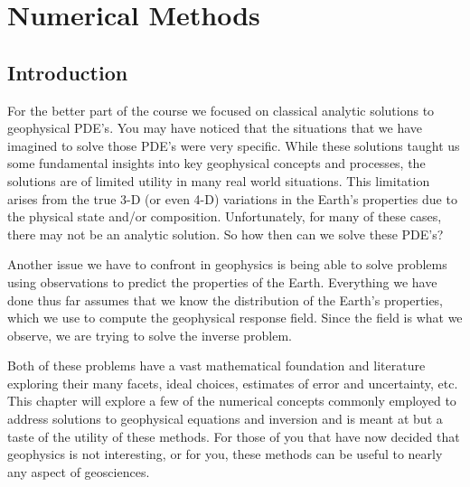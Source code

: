 \chapter{Numerical Methods}

\section{Introduction}
For the better part of the course we focused on classical analytic solutions to geophysical PDE's.  You may have noticed that the situations that we have imagined to solve those PDE's were very specific.  While these solutions taught us some fundamental insights into key geophysical concepts and processes, the solutions are of limited utility in many real world situations.  This limitation arises from the true 3-D (or even 4-D) variations in the Earth's properties due to the physical state and/or composition.  Unfortunately, for many of these cases, there may not be an analytic solution.  So how then can we solve these PDE's?

Another issue we have to confront in geophysics is being able to solve problems using observations to predict the properties of the Earth.  Everything we have done thus far assumes that we know the distribution of the Earth's properties, which we use to compute the geophysical response field.  Since the field is what we observe, we are trying to solve the inverse problem.

Both of these problems have a vast mathematical foundation and literature exploring their many facets, ideal choices, estimates of error and uncertainty, etc.  This chapter will explore a few of the numerical concepts commonly employed to address solutions to geophysical equations and inversion and is meant at but a taste of the utility of these methods.  For those of you that have now decided that geophysics is not interesting, or for you, these methods can be useful to nearly any aspect of geosciences.

